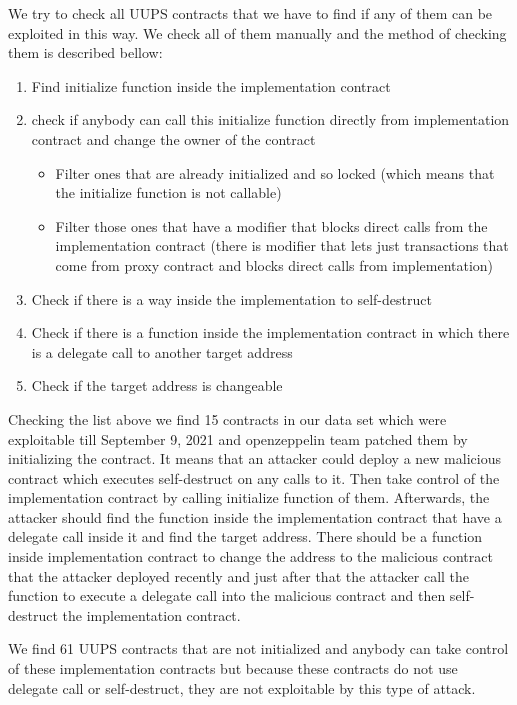 We try to check all UUPS contracts that we have to find if any of them can be exploited in this way. We check all of them manually and the method of checking them is described bellow:

\begin{enumerate}
  \item Find initialize function inside the implementation contract
  \item check if anybody can call this initialize function directly from implementation contract and change the owner of the contract
  \begin{itemize}
    \item Filter ones that are already initialized and so locked (which means that the initialize function is not callable)
    \item Filter those ones that have a modifier that blocks direct calls from the implementation contract (there is modifier that lets just transactions that come from proxy contract and blocks direct calls from implementation)
  \end{itemize}
  \item Check if there is a way inside the implementation to self-destruct 
  \item Check if there is a function inside the implementation contract in which there is a delegate call to another target address
  \item Check if the target address is changeable 
\end{enumerate}

Checking the list above we find 15 contracts in our data set which were exploitable till September 9, 2021 and openzeppelin team patched them by initializing the contract. It means that an attacker could deploy a new malicious contract which executes self-destruct on any calls to it. Then take control of the implementation contract by calling initialize function of them. Afterwards, the attacker should find the function inside the implementation contract that have a delegate call inside it and find the target address. There should be a function inside implementation contract to change the address to the malicious contract that the attacker deployed recently and just after that the attacker call the function to execute a delegate call into the malicious contract and then self-destruct the implementation contract.

We find 61 UUPS contracts that are not initialized and anybody can take control of these implementation contracts but because these contracts do not use delegate call or self-destruct, they are not exploitable by this type of attack.

